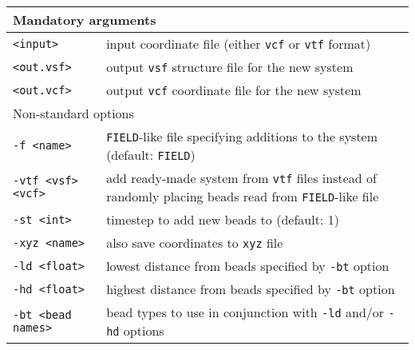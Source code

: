 \vspace{1em}
\noindent
\begin{longtable}{p{}p{}}
  \toprule
  \multicolumn{2}{l}{Mandatory arguments} \\
  \midrule
  \texttt{<input>} & input coordinate file (either \texttt{vcf} or
    \texttt{vtf} format) \\
  \texttt{<out.vsf>} & output \texttt{vsf} structure file for the new system \\
  \texttt{<out.vcf>} & output \texttt{vcf} coordinate file for the new
  system \\
  \toprule
  \multicolumn{2}{l}{Non-standard options} \\
  \midrule
  \texttt{-f <name>} & \texttt{FIELD}-like file specifying additions to the
    system (default: \texttt{FIELD}) \\
  \texttt{-vtf <vsf> <vcf>} & add ready-made system from \texttt{vtf} files
    instead of randomly placing beads read from \texttt{FIELD}-like file \\
  \texttt{-st <int>} & timestep to add new beads to (default: 1) \\
  \texttt{-xyz <name>} & also save coordinates to \texttt{xyz} file \\
  \texttt{-ld <float>} & lowest distance from beads specified by
    \texttt{-bt} option \\
  \texttt{-hd <float>} & highest distance from beads specified by
    \texttt{-bt} option \\
  \texttt{-bt <bead names>} & bead types to use in conjunction with
    \texttt{-ld} and/or \texttt{-hd} options \\
  \bottomrule
\end{longtable}
